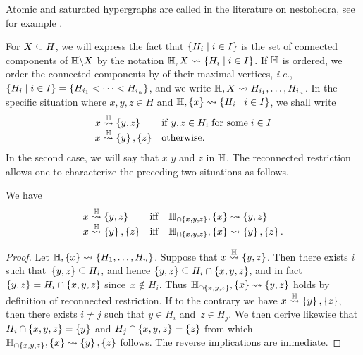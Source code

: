 \begin{rem}
    Atomic and saturated hypergraphs are called  in the  literature on nestohedra, see for example \cite{P09,FS05}.
\end{rem}

For $X\subseteq H$, we will express the fact that $\left\{H_i \mid i\in I\right\}$ is the set of connected components of ${\mathbb H}\backslash X$ by the notation ${\mathbb H},X  \leadsto  \left\{H_i \mid i\in I\right\}$.
If ${\mathbb H}$ is ordered, we order the connected components by  of their maximal vertices, \textit{i.e.}, $\left\{H_i \mid i\in I\right\}=\{H_{i_1}<\cdots < H_{i_n}\}$, and we write ${\mathbb H},X  \leadsto H_{i_1},\ldots,H_{i_n}$.
In the specific situation where $x,y,z\in H$ and ${\mathbb H},\left\{x\right\}\leadsto \left\{H_i \mid i\in I\right\}$, we shall write
$$\begin{array}{ll}
x\stackrel{{\mathbb H}}{\rightsquigarrow}\left\{y,z\right\} & \mathrm{if}\; y,z\in H_i\; \mbox{for some}\; i \in I\\
x\stackrel{{\mathbb H}}{\rightsquigarrow}\left\{y\right\},\left\{z\right\} & \mbox{otherwise}.
\end{array}$$
In the second case, we will say that $x$  $y$ and $z$ in ${\mathbb H}$. 
The reconnected restriction allows one to characterize the preceding two situations as follows.

\begin{lemma} 
\label{xyz-reconnected} 
We have
$$\begin{array}{lll}
x\stackrel{{\mathbb H}}{\rightsquigarrow}\left\{y,z\right\} & \mathrm{iff} & {\mathbb H}_{\cap \left\{x,y,z\right\}},\left\{x\right\}\leadsto\left\{y,z\right\} \\
x\stackrel{{\mathbb H}}{\rightsquigarrow}\left\{y\right\},\left\{z\right\} & \mathrm{iff} & {\mathbb H}_{\cap \left\{x,y,z\right\}},\left\{x\right\}\leadsto \left\{y\right\},\left\{z\right\}.
\end{array}$$
\end{lemma}

\begin{proof} 
    Let ${\mathbb H},\left\{x\right\}\leadsto \left\{H_1,\ldots,H_n\right\}$. 
    Suppose that $x\stackrel{{\mathbb H}}{\rightsquigarrow}\left\{y,z\right\}$. 
    Then there exists $i$ such that~$\left\{y,z\right\}\subseteq H_i$, and hence $\left\{y,z\right\}\subseteq H_i\cap\left\{x,y,z\right\}$, and in fact $\left\{y,z\right\} = H_i\cap\left\{x,y,z\right\}$ since~$x\not\in H_i$. 
    Thus ${\mathbb H}_{\cap \left\{x,y,z\right\}},\left\{x\right\}\leadsto\left\{y,z\right\}$ holds by definition of reconnected restriction.
    If to the contrary we have $x\stackrel{{\mathbb H}}{\rightsquigarrow}\left\{y\right\},\left\{z\right\}$, then there exists $i\neq j$ such that $y\in H_i$ and~$z\in H_j$. 
    We then derive likewise that $H_i\cap\left\{x,y,z\right\}=\left\{y\right\}$ and $H_j\cap\left\{x,y,z\right\}=\left\{z\right\}$ from which $ {\mathbb H}_{\cap \left\{x,y,z\right\}},\left\{x\right\}\leadsto \left\{y\right\},\left\{z\right\}$ follows.
    The reverse implications are immediate.
\end{proof}

